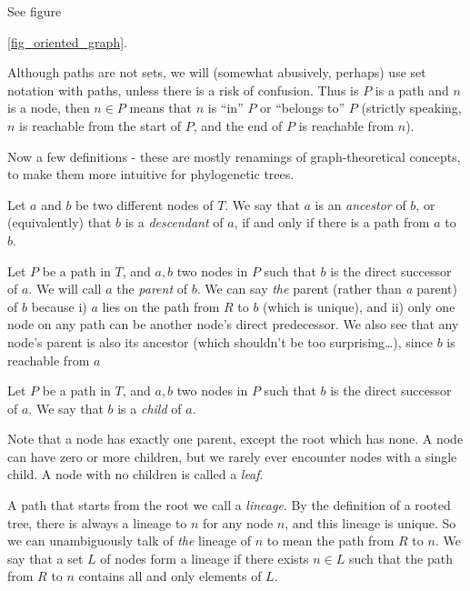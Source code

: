 See figure {\ref{fig_oriented_graph}.

Although paths are not sets, we will (somewhat abusively, perhaps) use set notation with paths, unless there is a risk of confusion. Thus is $P$ is a path and $n$ is a node, then $n \in P$ means that $n$ is ``in'' $P$  or ``belongs to'' $P$ (strictly speaking, $n$ is reachable from the start of $P$, and the end of $P$ is reachable from $n$).

Now a few definitions - these are mostly renamings of graph-theoretical concepts, to make them more intuitive for phylogenetic trees. 

\begin{dfn}
\label{def_ancestor}
Let $a$ and $b$ be two different nodes of $T$. We say that $a$ is an \textit{ancestor} of $b$, or (equivalently) that $b$ is a \textit{descendant} of $a$, if and only if there is a path from $a$ to $b$. 
\end{dfn}

\begin{dfn}
\label{def_parent}
Let $P$ be a path in $T$, and $a, b$ two nodes in $P$ such that $b$ is the direct successor of $a$. We will call $a$ the \textit{parent} of $b$. We can say \textit{the} parent (rather than \textit{a} parent) of $b$ because i) $a$ lies on the path from $R$ to $b$ (which is unique), and ii) only one node on any path can be another node's direct predecessor. We also see that any node's parent is also its ancestor (which shouldn't be too surprising\ldots), since $b$ is reachable from $a$
\end{dfn}

\begin{dfn}
\label{def_child}
Let $P$ be a path in $T$, and $a, b$ two nodes in $P$ such that $b$ is the direct successor of $a$. We say that $b$ is a \textit{child} of $a$.
\end{dfn}

Note that a node has exactly one parent, except the root which has none. A node can have zero or more children, but we rarely ever encounter nodes with a single child. A node with no children is called a \textit{leaf}.

\begin{dfn}
\label{def_lineage}
A path that starts from the root we call a \emph{lineage}. By the definition of a rooted tree, there is always a lineage to $n$ for any node $n$, and this lineage is unique. So we can unambiguously talk of \textit{the} lineage of $n$ to mean the path from $R$ to $n$. We say that a set $L$ of nodes form a lineage if there exists $n \in L$ such that the path from $R$ to $n$ contains all and only elements of $L$.
\end{dfn}

}
